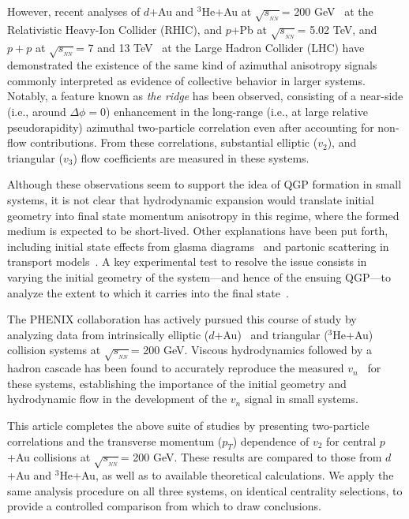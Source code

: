 \documentclass[%
reprint,
showpacs,preprintnumbers,
 amsmath,amssymb,
 aps,
]{revtex4-1}
\newcommand{\pt}{\mbox{$p_T$}\xspace}
\newcommand{\sqsn}{\mbox{$\sqrt{s_{_{NN}}}$}\xspace}
\newcommand{\dau}{\mbox{$d$+Au}\xspace}
\newcommand{\pau}{\mbox{$p$+Au}\xspace}
\newcommand{\hau}{\mbox{$^3\text{He}$+Au}\xspace}
\newcommand{\ppb}{\mbox{$p$+Pb}\xspace}
\begin{document}
However, recent analyses of \dau and \hau at \sqsn = 200 GeV~\cite{adare_measurement_2014,Adamczyk:2014fcx,PhysRevLett.115.142301} at the Relativistic Heavy-Ion Collider (RHIC), and \ppb at \sqsn = 5.02 TeV, and $p+p$ at \sqsn = 7 and 13 TeV~\cite{alice_long_2013,atlas_observation_2012,cms_observation_2012,Khachatryan:2015lva,Aad:2015gqa} at the Large Hadron Collider (LHC) have demonstrated the existence of the same kind of azimuthal anisotropy signals commonly interpreted as evidence of collective behavior in larger systems. Notably, a feature known as \textit{the ridge} has been observed, consisting of a near-side (i.e., around $\Delta \phi = 0$) enhancement in the long-range (i.e., at large relative pseudorapidity) azimuthal two-particle correlation even after accounting for non-flow contributions. From these correlations, substantial elliptic ($v_2$), and triangular ($v_3$) flow coefficients are measured in these systems.

Although these observations seem to support the idea of QGP formation in small systems, it is not clear that hydrodynamic expansion would translate initial geometry into final state momentum anisotropy in this regime, where the formed medium is expected to be short-lived. Other explanations have been put forth, including initial state effects from glasma diagrams~\cite{dusling_azimuthal_2012} and partonic scattering in transport models~\cite{bzdak_elliptic_2014,ma_long-range_2014,Koop:2015wea}. A key experimental test to resolve the issue consists in varying the initial geometry of the system---and hence of the ensuing QGP---to analyze the extent to which it carries into the final state~\cite{nagle_exploiting_2013}. 

The PHENIX collaboration has actively pursued this course of study by analyzing data from intrinsically elliptic (\dau)~\cite{adare_measurement_2014,PhysRevLett.111.212301} and triangular (\hau)~\cite{Adare:2015ctn} collision systems at \sqsn = 200 GeV. Viscous hydrodynamics followed by a hadron cascade has been found to accurately reproduce the measured $v_n$~\cite{Romatschke:2015gxa,adare_measurement_2014,PhysRevLett.111.212301,Adare:2015ctn} for these systems, establishing the importance of the initial geometry and hydrodynamic flow in the development of the $v_n$ signal in small systems.

This article completes the above suite of studies by presenting two-particle correlations and the transverse momentum (\pt) dependence of $v_2$ for central \pau collisions at \sqsn = 200 GeV. These results are compared to those from \dau and \hau, as well as to available theoretical calculations. We apply the same analysis procedure on all three systems, on identical centrality selections, to provide a controlled comparison from which to draw conclusions.
\end{document}
